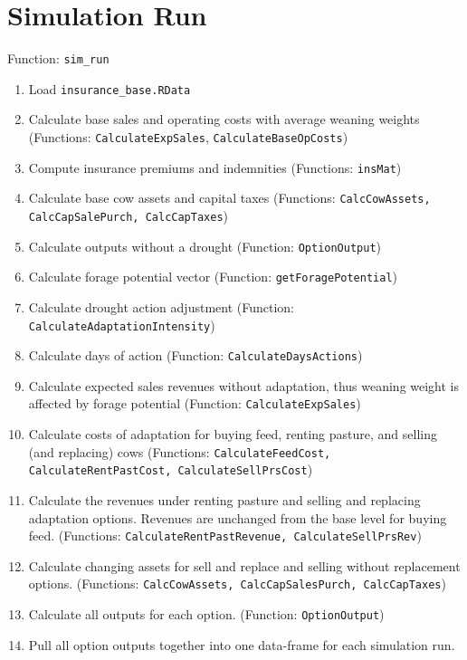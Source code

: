 \documentclass[11pt]{article}
\begin{document}
\section{Simulation Run}
Function: \verb!sim_run!
\begin{enumerate}
\item Load \verb!insurance_base.RData!
\item Calculate base sales and operating costs with average weaning weights (Functions: \verb!CalculateExpSales!, \verb!CalculateBaseOpCosts!)
\item Compute insurance premiums and indemnities (Functions: \verb!insMat!)
\item Calculate base cow assets and capital taxes (Functions: \verb!CalcCowAssets, CalcCapSalePurch, CalcCapTaxes!)
\item Calculate outputs without a drought (Function: \verb!OptionOutput!)
\item Calculate forage potential vector (Function: \verb!getForagePotential!)
\item Calculate drought action adjustment (Function: \verb!CalculateAdaptationIntensity!)
\item Calculate days of action (Function: \verb!CalculateDaysActions!)
\item Calculate expected sales revenues without adaptation, thus weaning weight is affected by forage potential (Function: \verb!CalculateExpSales!)
\item Calculate costs of adaptation for buying feed, renting pasture, and selling (and replacing) cows (Functions: \verb!CalculateFeedCost, CalculateRentPastCost, CalculateSellPrsCost!)
\item Calculate the revenues under renting pasture and selling and replacing adaptation options. Revenues are unchanged from the base level for buying feed. (Functions: \verb!CalculateRentPastRevenue, CalculateSellPrsRev!)
\item Calculate changing assets for sell and replace and selling without replacement options. (Functions: \verb!CalcCowAssets, CalcCapSalesPurch, CalcCapTaxes!)
\item Calculate all outputs for each option. (Function: \verb!OptionOutput!)
\item Pull all option outputs together into one data-frame for each simulation run.
\end{enumerate}
\end{document}
